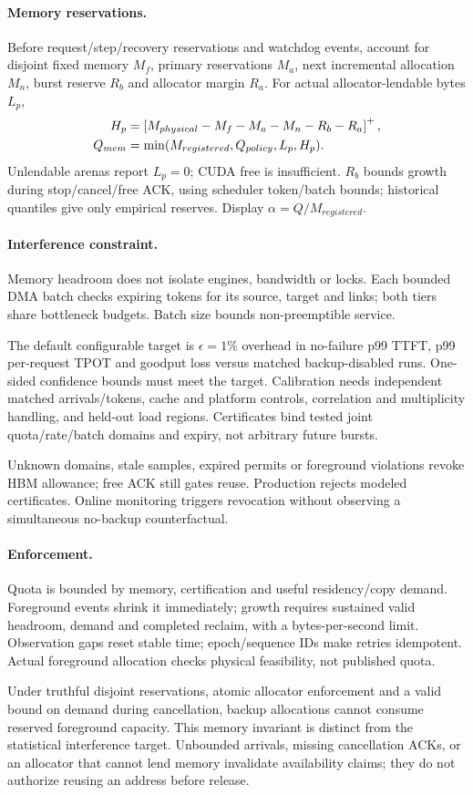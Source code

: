 \paragraph{Memory reservations.}
Before request/step/recovery reservations and watchdog events, account for
disjoint fixed memory $M_f$, primary reservations $M_a$, next incremental
allocation $M_n$, burst reserve $R_b$ and allocator margin $R_a$. For actual
allocator-lendable bytes $L_p$,
\begin{align}
H_p &= \left[M_{physical}-M_f-M_a-M_n-R_b-R_a\right]^+,\\
Q_{mem} &= \min(M_{registered},Q_{policy},L_p,H_p).
\end{align}
Unlendable arenas report $L_p=0$; CUDA free is insufficient. $R_b$ bounds growth
during stop/cancel/free ACK, using scheduler token/batch bounds; historical
quantiles give only empirical reserves. Display $\alpha=Q/M_{registered}$.

\paragraph{Interference constraint.}
Memory headroom does not isolate engines, bandwidth or locks. Each bounded
DMA batch checks expiring tokens for its source, target and links; both tiers
share bottleneck budgets. Batch size bounds non-preemptible service.

The default configurable target is $\epsilon=1\%$ overhead in no-failure p99
TTFT, p99 per-request TPOT and goodput loss versus matched backup-disabled
runs. One-sided confidence bounds must meet the target. Calibration needs
independent matched arrivals/tokens, cache and platform controls, correlation
and multiplicity handling, and held-out load regions. Certificates bind tested
joint quota/rate/batch domains and expiry, not arbitrary future bursts.

Unknown domains, stale samples, expired permits or foreground violations
revoke HBM allowance; free ACK still gates reuse. Production rejects modeled
certificates. Online monitoring triggers revocation without observing a
simultaneous no-backup counterfactual.

\paragraph{Enforcement.}
Quota is bounded by memory, certification and useful residency/copy demand.
Foreground events shrink it immediately; growth requires sustained valid
headroom, demand and completed reclaim, with a bytes-per-second limit.
Observation gaps reset stable time; epoch/sequence IDs make retries idempotent.
Actual foreground allocation checks physical feasibility, not published quota.


Under truthful disjoint reservations, atomic allocator enforcement and a
valid bound on demand during cancellation, backup allocations cannot consume
reserved foreground capacity. This memory invariant is distinct from the
statistical interference target. Unbounded arrivals, missing cancellation
ACKs, or an allocator that cannot lend memory invalidate availability claims;
they do not authorize reusing an address before release.
